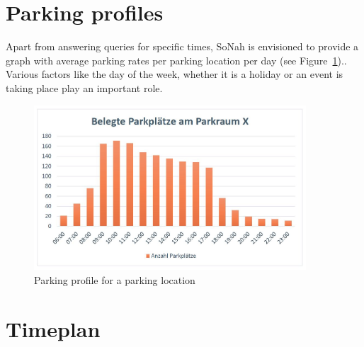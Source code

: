 \documentclass{article}
\begin{document}
\section{Parking profiles}
Apart from answering queries for specific times, SoNah is envisioned to provide a graph with average parking
rates per parking location per day (see Figure~\ref{stosszeiten}).. Various factors like the day of the week, whether it is a holiday or an event is taking place play an important role.

\begin{figure}[!ht]
    \centering
    \includegraphics[width=4.0in]{Stosszeiten}
    \caption{Parking profile for a parking location}
    \label{stosszeiten}
\end{figure}

\section{Timeplan}

\nocite{*}

\printbibliography
\end{document}
